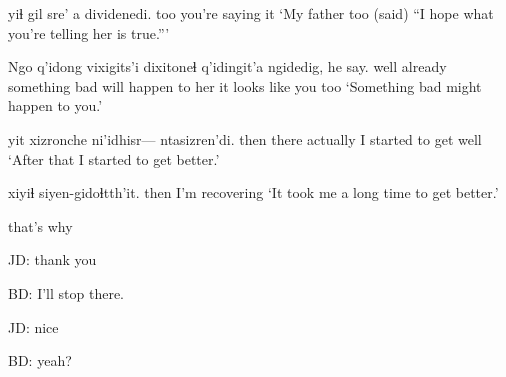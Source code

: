 \documentclass[12pt]{article}
\begin{document}
 yiɬ {gil sre' a} dividenedi. 
{}  too  {} {you're saying it}
\glt `My father too (said) ``I hope what you're telling her is true.'''
\glend

\gll Ngo q'idong {vixigits'i dixitoneɬ} q'idingit'a ngidedig, he say.
well    already           {something bad will happen to her} {it looks like} {you too}
\glt `Something bad might happen to you.'
\glend

 yit  xizronche ni'idhisr--- ntasizren'di.
then             there         actually {}      {I started to get well}
\glt `After that I started to get better.'
\glend

 xiyiɬ siyen-gidoɬtth'it.
{} then  {I'm recovering}
\glt `It took me a long time to get better.'
\glend

that's why

JD:  thank you

BD:  I'll stop there.

JD:  nice

BD:  yeah?  
\end{document}
